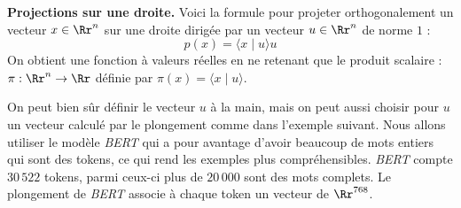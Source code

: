 \documentclass[11pt,class=report,crop=false]{standalone}
\begin{document}

\bigskip

\textbf{Projections sur une droite.}
Voici la formule pour projeter orthogonalement un vecteur $x \in \Rr^n$ sur une droite dirigée par un vecteur $u \in \Rr^n$ de norme $1$ :
$$p(x) = \langle x \mid u \rangle u$$
On obtient une fonction à valeurs réelles en ne retenant que le produit scalaire : $\pi : \Rr^n \to \Rr$ définie par $\pi(x) = \langle x \mid u \rangle$.


On peut bien sûr définir le vecteur $u$ à la main, mais on peut aussi choisir pour $u$ un vecteur calculé par le plongement comme dans l'exemple suivant.
Nous allons utiliser le modèle \emph{BERT} qui a pour avantage d'avoir beaucoup de mots entiers qui sont des tokens, ce qui rend les exemples plus compréhensibles. \emph{BERT} compte $30\,522$ tokens, parmi ceux-ci plus de $20\,000$ sont des mots complets. Le plongement de \emph{BERT} associe à chaque token un vecteur de $\Rr^{768}$.
\end{document}
